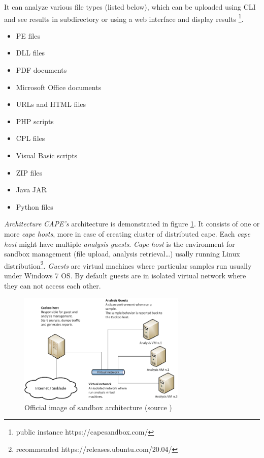 It can analyze various file types (listed below), which can be uploaded using CLI and see results in subdirectory or using a web interface and display results \footnote{public instance https://capesandbox.com/}.
\begin{itemize}
  \item PE files
  \item DLL files
  \item PDF documents
  \item Microsoft Office documents
  \item URLs and HTML files
  \item PHP scripts
  \item CPL files
  \item Visual Basic scripts
  \item ZIP files
  \item Java JAR
  \item Python files 
\end{itemize}


\emph{Architecture}
\emph{CAPE's} architecture is demonstrated in figure \ref{fig:capearchitecture}. It consists of one or more \emph{cape hosts}, more in case of creating cluster of distributed cape. Each \emph{cape host} might have multiple \emph{analysis guests}. \emph{Cape host} is the environment for sandbox management (file upload, analysis retrieval\dots) usally running Linux distribution\footnote{recommended https://releases.ubuntu.com/20.04/}. \emph{Guests} are virtual machines where particular samples run usually under Windows 7 OS. By default guests are in isolated virtual network where they can not access each other.

\begin{figure}[h]
  \centering
  \includegraphics[width=8cm]{figures/architecture.png}
  \caption{Official image of sandbox architecture (source \cite{CAPESand75:online})}
  \label{fig:capearchitecture}
\end{figure}


